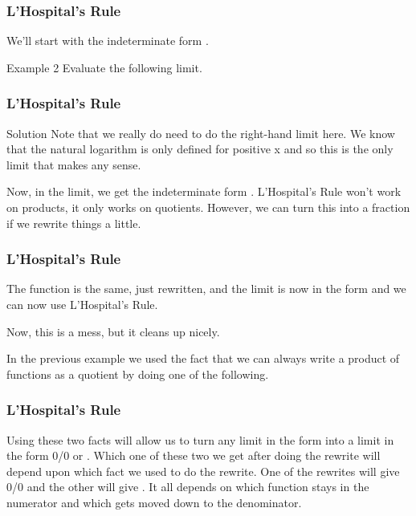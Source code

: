 \documentclass{beamer}
\begin{document}
\begin{frame}
	\frametitle{L’Hospital’s Rule}
	\large
We’ll start with the indeterminate form .
 
Example 2  Evaluate the following limit.
         \end{frame}
         \begin{frame}
         	\frametitle{L’Hospital’s Rule}
         	\large                                                       
Solution
Note that we really do need to do the right-hand limit here.  We know that the natural logarithm is only defined for positive x and so this is the only limit that makes any sense.
 
Now, in the limit, we get the indeterminate form .  L’Hospital’s Rule won’t work on products, it only works on quotients.  However, we can turn this into a fraction if we rewrite things a little.
\end{frame}
\begin{frame}
	\frametitle{L’Hospital’s Rule}
	\large                                      
The function is the same, just rewritten, and the limit is now in the form  and we can now use L’Hospital’s Rule.
                                              
 
Now, this is a mess, but it cleans up nicely.

 
In the previous example we used the fact that we can always write a product of functions as a quotient by doing one of the following.

\end{frame}
\begin{frame}
	\frametitle{L’Hospital’s Rule}
	\large
 
Using these two facts will allow us to turn any limit in the form  into a limit in the form 0/0 or .  Which one of these two we get after doing the rewrite will depend upon which fact we used to do the rewrite.  One of the rewrites will give 0/0 and the other will give .  It all depends on which function stays in the numerator and which gets moved down to the denominator. 
\end{frame}
\end{document}
